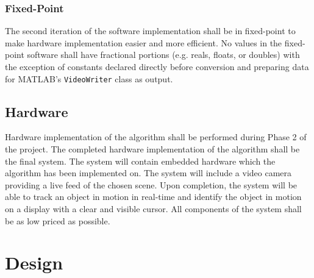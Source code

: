 \documentclass[11pt]{article} %
\begin{document}
\subsubsection{Fixed-Point}
The second iteration of the software implementation shall be in fixed-point to make hardware implementation easier and more efficient. No values in the fixed-point software shall have fractional portions (e.g. reals, floats, or doubles) with the exception of constants declared directly before conversion and preparing data for MATLAB's \texttt{VideoWriter} class as output.
\subsection{Hardware}
Hardware implementation of the algorithm shall be performed during Phase 2 of the project. The completed hardware implementation of the algorithm shall be the final system. The system will contain embedded hardware which the algorithm has been implemented on. The system will include a video camera providing a live feed of the chosen scene. Upon completion, the system will be able to track an object in motion in real-time and identify the object in motion on a display with a clear and visible cursor. All components of the system shall be as low priced as possible.
\section{Design}
\end{document}
